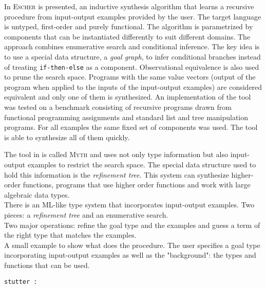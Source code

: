 In \cite{Albarghouthi:2013:RPS:2526861.2526942} \textsc{Escher} is presented, an inductive synthesis algorithm that learns a recursive procedure from input-output examples provided by the user.  The target language is untyped, first-order and purely functional.
The algorithm is parametrized by components that can be instantiated differently to suit different domains.
The approach combines enumerative search and conditional inference. The key idea is to use a special data structure, a \emph{goal graph}, to infer conditional branches instead of treating \texttt{if-then-else} as a component.
Observational equivalence is also used to prune the search space. Programs with the same value vectors (output of the program when applied to the inputs of the input-output examples) are considered equivalent and only one of them is synthesized.
An implementation of the tool was tested on a benchmark consisting of recursive programs  drawn from functional programming assignments and standard list and tree manipulation programs.
For all examples the same fixed set of components was used.
The tool is able to synthesize all of them quickly. 

The tool in \cite{Osera:2015:TPS:2737924.2738007} is called \textsc{Myth} and uses not only type information but also input-output examples to restrict the search space. The special data structure used to hold this information is the \emph{refinement tree}. This system can synthesize higher-order functions, programs that use higher order functions and work with large algebraic data types.\\
There is an ML-like type system that incorporates input-output examples. Two pieces: a \emph{refinement tree} and an enumerative search.\\
Two major operations: refine the goal type and the examples and guess a term of the right type that matches the examples.\\
A small example to show what does the procedure. The user specifies a goal type incorporating input-output examples as well as the "background": the types and functions that can be used.
\begin{lstlisting}
stutter : 
\end{lstlisting}



